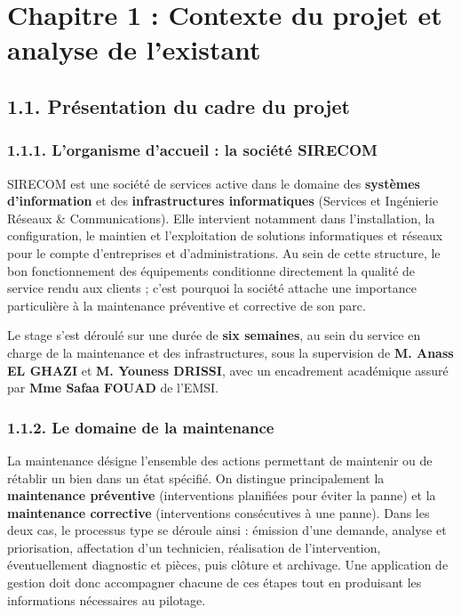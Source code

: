 \documentclass[11pt,a4paper]{report}
\begin{document}
\chapter*{Chapitre 1 : Contexte du projet et analyse de l'existant}
\section*{1.1. Présentation du cadre du projet}
\subsection*{1.1.1. L'organisme d'accueil : la société SIRECOM}

SIRECOM est une société de services active dans le domaine des \textbf{systèmes d'information} et des \textbf{infrastructures informatiques} (Services et Ingénierie Réseaux \& Communications). Elle intervient notamment dans l'installation, la configuration, le maintien et l'exploitation de solutions informatiques et réseaux pour le compte d'entreprises et d'administrations. Au sein de cette structure, le bon fonctionnement des équipements conditionne directement la qualité de service rendu aux clients ; c'est pourquoi la société attache une importance particulière à la maintenance préventive et corrective de son parc.

Le stage s'est déroulé sur une durée de \textbf{six semaines}, au sein du service en charge de la maintenance et des infrastructures, sous la supervision de \textbf{M. Anass EL GHAZI} et \textbf{M. Youness DRISSI}, avec un encadrement académique assuré par \textbf{Mme Safaa FOUAD} de l'EMSI.
\subsection*{1.1.2. Le domaine de la maintenance}

La maintenance désigne l'ensemble des actions permettant de maintenir ou de rétablir un bien dans un état spécifié. On distingue principalement la \textbf{maintenance préventive} (interventions planifiées pour éviter la panne) et la \textbf{maintenance corrective} (interventions consécutives à une panne). Dans les deux cas, le processus type se déroule ainsi : émission d'une demande, analyse et priorisation, affectation d'un technicien, réalisation de l'intervention, éventuellement diagnostic et pièces, puis clôture et archivage. Une application de gestion doit donc accompagner chacune de ces étapes tout en produisant les informations nécessaires au pilotage.
\end{document}

